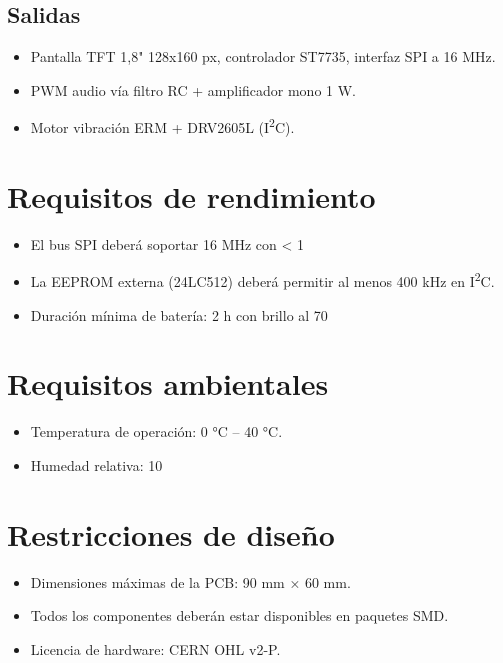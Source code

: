 \documentclass[11pt,a4paper]{article}
\begin{document}
\subsection{Salidas}
\begin{itemize}
  \item Pantalla TFT 1,8" 128x160 px, controlador ST7735, interfaz SPI a 16 MHz.
  \item PWM audio vía filtro RC + amplificador mono 1 W.
  \item Motor vibración ERM + DRV2605L (I\textsuperscript{2}C).
\end{itemize}

\section{Requisitos de rendimiento}
\begin{itemize}
  \item El bus SPI deberá soportar 16 MHz con \textless{} 1 %
  \item La EEPROM externa (24LC512) deberá permitir al menos 400 kHz en I\textsuperscript{2}C.
  \item Duración mínima de batería: 2 h con brillo al 70 %
\end{itemize}

\section{Requisitos ambientales}
\begin{itemize}
  \item Temperatura de operación: 0 °C – 40 °C.
  \item Humedad relativa: 10 %
\end{itemize}

\section{Restricciones de diseño}
\begin{itemize}
  \item Dimensiones máximas de la PCB: 90 mm × 60 mm.
  \item Todos los componentes deberán estar disponibles en paquetes SMD.
  \item Licencia de hardware: CERN OHL v2-P.
\end{itemize}
\end{document}
